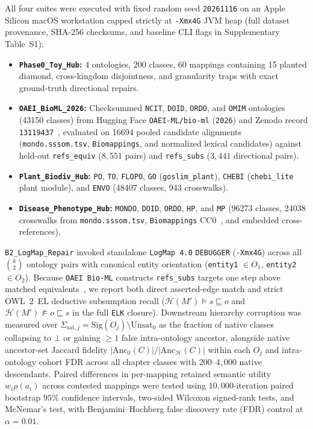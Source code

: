 \documentclass[10pt]{article}
\theoremstyle{accentdef}
\newcommand{\ClaspDiseasePhenotypeHubClasses}{96273}
\newcommand{\ClaspDiseasePhenotypeHubMappings}{24038}
\newcommand{\ClaspOAEIBioMLClasses}{43150}
\newcommand{\ClaspOAEIBioMLMappings}{16694}
\newcommand{\ClaspPhaseToyHubClasses}{200}
\newcommand{\ClaspPhaseToyHubMappings}{60}
\newcommand{\ClaspPlantBiodivHubClasses}{48407}
\newcommand{\ClaspPlantBiodivHubMappings}{943}
\begin{document}
All four suites were executed with fixed random seed \texttt{20261116} on an Apple Silicon macOS workstation capped strictly at \texttt{-Xmx4G} JVM heap (full dataset provenance, SHA-256 checksums, and baseline CLI flags in Supplementary Table~S1):
\begin{itemize}
  \item \textbf{\texttt{Phase0\_Toy\_Hub}:} 4 ontologies, \num{\ClaspPhaseToyHubClasses} classes, \num{\ClaspPhaseToyHubMappings} mappings containing 15 planted diamond, cross-kingdom disjointness, and granularity traps with exact ground-truth directional repairs.
  \item \textbf{\texttt{OAEI\_BioML\_2026}:} Checksummed \texttt{NCIT}, \texttt{DOID}, \texttt{ORDO}, and \texttt{OMIM} ontologies (\num{\ClaspOAEIBioMLClasses} classes) from Hugging Face \texttt{OAEI-ML/bio-ml} (\texttt{2026}) and Zenodo record \texttt{13119437}~\cite{he2022bioml}, evaluated on \num{\ClaspOAEIBioMLMappings} pooled candidate alignments (\texttt{mondo.sssom.tsv}, \texttt{Biomappings}, and normalized lexical candidates) against held-out \texttt{refs\_equiv} ($8{,}551$ pairs) and \texttt{refs\_subs} ($3{,}441$ directional pairs).
  \item \textbf{\texttt{Plant\_Biodiv\_Hub}:} \texttt{PO}, \texttt{TO}, \texttt{FLOPO}, \texttt{GO} (\texttt{goslim\_plant}), \texttt{CHEBI} (\texttt{chebi\_lite} plant module), and \texttt{ENVO} (\num{\ClaspPlantBiodivHubClasses} classes, \num{\ClaspPlantBiodivHubMappings} crosswalks).
  \item \textbf{\texttt{Disease\_Phenotype\_Hub}:} \texttt{MONDO}, \texttt{DOID}, \texttt{ORDO}, \texttt{HP}, and \texttt{MP} (\num{\ClaspDiseasePhenotypeHubClasses} classes, \num{\ClaspDiseasePhenotypeHubMappings} crosswalks from \texttt{mondo.sssom.tsv}, \texttt{Biomappings} CC0~\cite{hoyt2023biomappings}, and embedded cross-references).
\end{itemize}
\texttt{B2\_LogMap\_Repair} invoked standalone \texttt{LogMap~4.0} \texttt{DEBUGGER} (\texttt{-Xmx4G}) across all $\binom{k}{2}$ ontology pairs with canonical entity orientation (\texttt{entity1} $\in O_1$, \texttt{entity2} $\in O_2$). Because \texttt{OAEI Bio-ML} constructs \texttt{refs\_subs} targets one step above matched equivalents~\cite{he2022bioml}, we report both direct asserted-edge match and strict OWL~2~EL deductive subsumption recall ($\mathcal{H}(M') \models s \sqsubseteq o$ and $\mathcal{H}(M') \not\models o \sqsubseteq s$ in the full \texttt{ELK} closure). Downstream hierarchy corruption was measured over $\Sigma_{\mathrm{sat},j} = \mathrm{Sig}(O_j) \setminus \mathrm{Unsat}_0$ as the fraction of native classes collapsing to $\bot$ or gaining $\ge 1$ false intra-ontology ancestor, alongside native ancestor-set Jaccard fidelity $|\mathrm{Anc}_0(C)| / |\mathrm{Anc}_{\mathcal{H}}(C)|$ within each $O_j$ and intra-ontology cohort FDR across all chapter classes with $200\text{--}4{,}000$ native descendants. Paired differences in per-mapping retained semantic utility $w_i \rho(a_i)$ across contested mappings were tested using $10{,}000$-iteration paired bootstrap $95\%$ confidence intervals, two-sided Wilcoxon signed-rank tests, and McNemar's test, with Benjamini--Hochberg false discovery rate (FDR) control at $\alpha = 0.01$.
\end{document}
